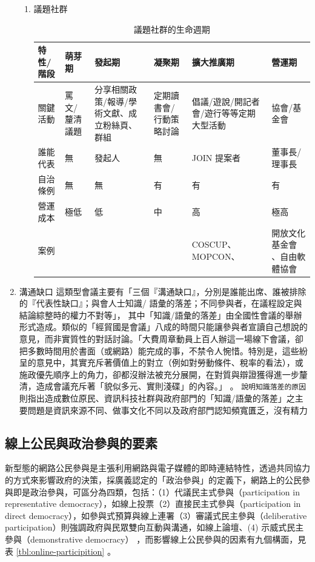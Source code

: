 \documentclass[12pt,a4paper]{article}
\begin{document}
\begin{enumerate}
\begin{enumerate}
\item 議題社群
\label{sec:orgb039e15}
\begin{table}[htbp]
\caption{\label{tab:org7fd19b7}
議題社群的生命週期}
\centering
{} \footnotesize \setlength{\tabcolsep}{3pt}
\begin{tabular}{llp{80pt}p{80pt}p{80pt}p{80pt}}
\toprule
特性/階段 & 萌芽期 & 發起期 & 凝聚期 & 擴大推廣期 & 營運期\\
\midrule
關鍵活動 & 罵文/釐清議題 & 分享相關政策/報導/學術文獻、成立粉絲頁、群組 & 定期讀書會/行動策略討論 & 倡議/遊說/開記者會/遊行等等定期大型活動 & 協會/基金會\\
誰能代表 & 無 & 發起人 & 無 & JOIN 提案者 & 董事長/理事長\\
自治條例 & 無 & 無 & 有 & 有 & 有\\
營運成本 & 極低 & 低 & 中 & 高 & 極高\\
案例 &  &  &  & COSCUP、MOPCON、 & 開放文化基金會 、自由軟體協會\\
\bottomrule
\end{tabular}
\end{table}
\end{enumerate}
\item 溝通缺口
\label{sec:org88550d7}
這類型會議主要有「三個『溝通缺口』，分別是誰能出席、誰被排除的『代表性缺口』；與會人士知識/ 語彙的落差；不同參與者，在議程設定與結論綜整時的權力不對等」\citep*{alberttzeng08}，
其中「知識/語彙的落差」由全國性會議的舉辦形式造成。類似的「經貿國是會議」八成的時間只能讓參與者宣讀自己想說的意見，而非實質性的對話討論。「大費周章動員上百人辦這一場線下會議，卻把多數時間用於書面（或網路）能完成的事，不禁令人惋惜。特別是，這些紛呈的意見中，其實充斥著價值上的對立（例如對勞動條件、稅率的看法），或施政優先順序上的角力，卻都沒辦法被充分展開，在對質與辯證獲得進一步釐清，造成會議充斥著「貌似多元、實則淺碟」的內容。」\citep*{albert2014} 。
\texttt{說明知識落差的原因}
則指出造成數位原民、資訊科技社群與政府部門的「知識/語彙的落差」之主要問題是資訊來源不同、做事文化不同以及政府部門認知頻寬匱乏，沒有精力
\end{enumerate}
\subsection{線上公民與政治參與的要素}
\label{sec:org1a26084}
新型態的網路公民參與是主張利用網路與電子媒體的即時連結特性，透過共同協力的方式來影響政府的決策，採廣義認定的「政治參與」的定義下，網路上的公民參與即是政治參與，可區分為四類，包括：（1）代議民主式參與（participation  in  representative  democracy），如線上投票（2）直接民主式參與（participation  in  direct  democracy），如參與式預算與線上連署（3）審議式民主參與（deliberative participation）則強調政府與民眾雙向互動與溝通，如線上論壇、(4) 示威式民主參與（demonstrative democracy）\citep*{chen16} ，而影響線上公民參與的因素有九個構面，見表 \ref{tbl:online-participition} 。
\end{document}
